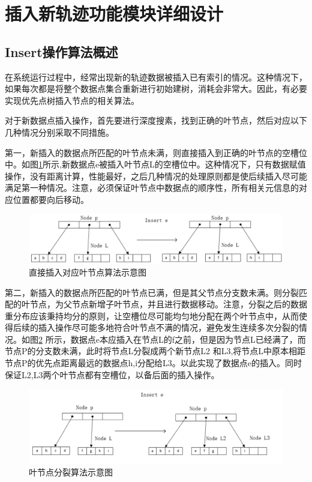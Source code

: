 \section{插入新轨迹功能模块详细设计}
\subsection{Insert操作算法概述}
在系统运行过程中，经常出现新的轨迹数据被插入已有索引的情况。这种情况下，如果每次都是将整个数据点集合重新进行初始建树，消耗会非常大。因此，有必要实现优先点树插入节点的相关算法。

对于新数据点插入操作，首先要进行深度搜素，找到正确的叶节点，然后对应以下几种情况分别采取不同措施。

第一，新插入的数据点所匹配的叶节点未满，则直接插入到正确的叶节点的空槽位中。如图\ref{insert-show0}所示,新数据点e被插入叶节点L的空槽位中。这种情况下，只有数据赋值操作，没有距离计算，性能最好，之后几种情况的处理原则都是使后续插入尽可能满足第一种情况。注意，必须保证叶节点中数据点的顺序性，所有相关元信息的对应位置都要向后移动。

\begin{figure}[H]
  \centering
  \includegraphics[width=6in]{new_FIGs/chapter4/insert-show0.pdf}
  \caption{直接插入对应叶节点算法示意图}\label{insert-show0}

\end{figure}
第二，新插入的数据点所匹配的叶节点已满，但是其父节点分支数未满。则分裂匹配的叶节点，为父节点新增子叶节点，并且进行数据移动。注意，分裂之后的数据重分布应该秉持均分的原则，让空槽位尽可能均匀地分配在两个叶节点中，从而使得后续的插入操作尽可能多地符合叶节点不满的情况，避免发生连续多次分裂的情况。如图\ref{insert-show1} 所示，数据点e本应插入在节点L的f之前，但是因为节点L已经满了，而节点P的分支数未满，此时将节点L分裂成两个新节点L2 和L3,将节点L中原本相距节点P的优先点距离最远的数据点h,i分配给L3。以此实现了数据点e的插入。同时保证L2,L3两个叶节点都有空槽位，以备后面的插入操作。

\begin{figure}[H]
  \centering
  \includegraphics[width=6in]{new_FIGs/chapter4/insert-show1.pdf}
  \caption{叶节点分裂算法示意图}\label{insert-show1}
\end{figure}

